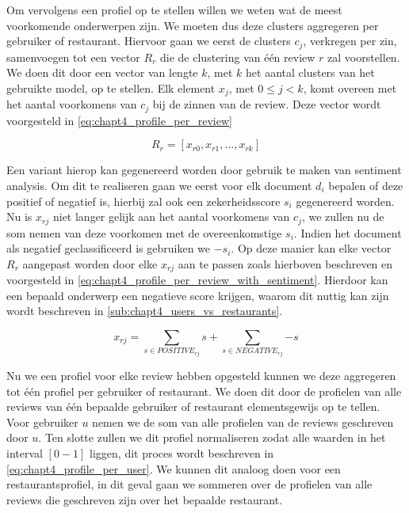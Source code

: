 Om vervolgens een profiel op te stellen willen we weten wat de meest voorkomende onderwerpen zijn. We moeten dus deze clusters aggregeren per gebruiker of restaurant. Hiervoor gaan we eerst de clusters $c_j$, verkregen per zin, samenvoegen tot een vector $R_r$ die de clustering van één review $r$ zal voorstellen. We doen dit door een vector van lengte $k$, met $k$ het aantal clusters van het gebruikte model, op te stellen. Elk element $x_j$, met $0 \le j < k$, komt overeen met het aantal voorkomens van $c_j$ bij de zinnen van de review. Deze vector wordt voorgesteld in \autoref{eq:chapt4_profile_per_review}

\begin{equation}
\label{eq:chapt4_profile_per_review}
    R_r = [x_{r0}, x_{r1}, ..., x_{rk}]
\end{equation}

Een variant hierop kan gegenereerd worden door gebruik te maken van sentiment analysis. Om dit te realiseren gaan we eerst voor elk document $d_i$ bepalen of deze positief of negatief is, hierbij zal ook een zekerheidsscore $s_i$ gegenereerd worden. Nu is $x_{rj}$ niet langer gelijk aan het aantal voorkomens van $c_j$, we zullen nu de som nemen van deze voorkomen met de overeenkomstige $s_i$. Indien het document als negatief geclassificeerd is gebruiken we $-s_i$. Op deze manier kan elke vector $R_r$ aangepast worden door elke $x_{rj}$ aan te passen zoals hierboven beschreven en voorgesteld in \autoref{eq:chapt4_profile_per_review_with_sentiment}. Hierdoor kan een bepaald onderwerp een negatieve score krijgen, waarom dit nuttig kan zijn wordt beschreven in \autoref{sub:chapt4_users_vs_restaurants}.

\begin{equation}
\label{eq:chapt4_profile_per_review_with_sentiment}
    x_{rj} = \sum_{s \in POSITIVE_{rj}}{s} + \sum_{s \in NEGATIVE_{rj}}{-s}
\end{equation}

Nu we een profiel voor elke review hebben opgesteld kunnen we deze aggregeren tot één profiel per gebruiker of restaurant. We doen dit door de profielen van alle reviews van één bepaalde gebruiker of restaurant elementsgewijs op te tellen. Voor gebruiker $u$ nemen we de som van alle profielen van de reviews geschreven door  $u$. Ten slotte zullen we dit profiel normaliseren zodat alle waarden in het interval $[0-1]$ liggen, dit proces wordt beschreven in \autoref{eq:chapt4_profile_per_user}. We kunnen dit analoog doen voor een restaurantsprofiel, in dit geval gaan we sommeren over de profielen van alle reviews die geschreven zijn over het bepaalde restaurant.


